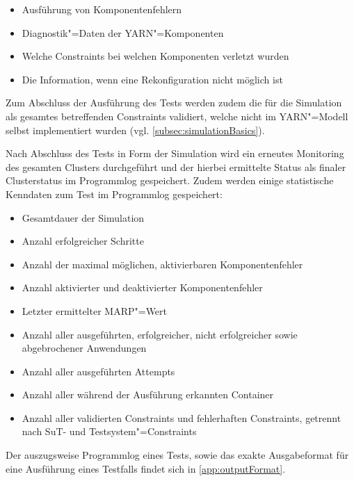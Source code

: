 \begin{itemize}
    \item Ausführung von Komponentenfehlern
    \item Diagnostik"=Daten der YARN"=Komponenten
    \item Welche Constraints bei welchen Komponenten verletzt wurden
    \item Die Information, wenn eine Rekonfiguration nicht möglich ist
\end{itemize}

Zum Abschluss der Ausführung des Tests werden zudem die für die Simulation als gesamtes betreffenden Constraints validiert, welche nicht im \ac{YARN}"=Modell selbst implementiert wurden (vgl. \cref{subsec:simulationBasics}).

Nach Abschluss des Tests in Form der Simulation wird ein erneutes Monitoring des gesamten Clusters durchgeführt und der hierbei ermittelte Status als finaler Clusterstatus im Programmlog gespeichert.
Zudem werden einige statistische Kenndaten zum Test im Programmlog gespeichert:

\begin{itemize}
    \item Gesamtdauer der Simulation
    \item Anzahl erfolgreicher Schritte
    \item Anzahl der maximal möglichen, aktivierbaren Komponentenfehler
    \item Anzahl aktivierter und deaktivierter Komponentenfehler
    \item Letzter ermittelter \ac{MARP}"=Wert
    \item Anzahl aller ausgeführten, erfolgreicher, nicht erfolgreicher sowie abgebrochener Anwendungen
    \item Anzahl aller ausgeführten Attempts
    \item Anzahl aller während der Ausführung erkannten Container
    \item Anzahl aller validierten Constraints und fehlerhaften Constraints, getrennt nach \ac{SuT}- und Testsystem"=Constraints
\end{itemize}

Der auszugsweise Programmlog eines Tests, sowie das exakte Ausgabeformat für eine Ausführung eines Testfalls findet sich in \cref{app:outputFormat}.